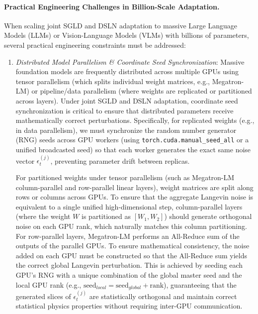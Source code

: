 \paragraph{Practical Engineering Challenges in Billion-Scale Adaptation.} When scaling joint SGLD and DSLN adaptation to massive Large Language Models (LLMs) or Vision-Language Models (VLMs) with billions of parameters, several practical engineering constraints must be addressed:
\begin{enumerate}
\item \emph{Distributed Model Parallelism \& Coordinate Seed Synchronization}: Massive foundation models are frequently distributed across multiple GPUs using tensor parallelism (which splits individual weight matrices, e.g., Megatron-LM) or pipeline/data parallelism (where weights are replicated or partitioned across layers).
Under joint SGLD and DSLN adaptation, coordinate seed synchronization is critical to ensure that distributed parameters receive mathematically correct perturbations.
Specifically, for replicated weights (e.g., in data parallelism), we must synchronize the random number generator (RNG) seeds across GPU workers (using \texttt{torch.cuda.manual\_seed\_all} or a unified broadcasted seed) so that each worker generates the exact same noise vector $\epsilon^{(j)}_t$, preventing parameter drift between replicas.

For partitioned weights under tensor parallelism (such as Megatron-LM column-parallel and row-parallel linear layers), weight matrices are split along rows or columns across GPUs.
To ensure that the aggregate Langevin noise is equivalent to a single unified high-dimensional step, column-parallel layers (where the weight $W$ is partitioned as $[W_1, W_2]$) should generate orthogonal noise on each GPU rank, which naturally matches this column partitioning.
For row-parallel layers, Megatron-LM performs an All-Reduce sum of the outputs of the parallel GPUs.
To ensure mathematical consistency, the noise added on each GPU must be constructed so that the All-Reduce sum yields the correct global Langevin perturbation.
This is achieved by seeding each GPU's RNG with a unique combination of the global master seed and the local GPU rank (e.g., $\text{seed}_{local} = \text{seed}_{global} + \text{rank}$), guaranteeing that the generated slices of $\epsilon^{(j)}_t$ are statistically orthogonal and maintain correct statistical physics properties without requiring inter-GPU communication.


\end{enumerate}
